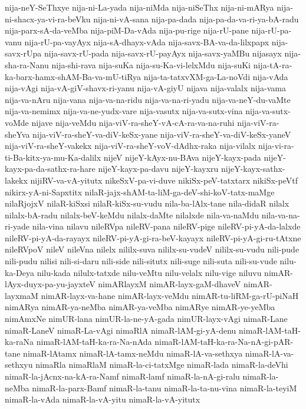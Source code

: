 {nija-neY-SeThxye
nija-ni-La-yada
nija-niMda
nija-niSeThx
nija-ni-mARya
nija-ni-shacx-ya-vi-ra-beVku
nija-ni-vA-sana
nija-pa-dada
nija-pa-da-va-ri-ya-bA-radu
nija-parx-sA-da-veMba
nija-piM-Da-vAda
nija-pu-rige
nija-rU-pane
nija-rU-pa-vanu
nija-rU-pa-vayAyx
nija-sA-dhayx-vAda
nija-savx-BA-va-da-lilxpapx
nija-savx-rUpa
nija-savx-rU-pada
nija-savx-rU-payAyx
nija-savx-yaMBu
nijasayx
nija-sha-ra-Nanu
nija-shi-rava
nija-suKa
nija-su-Ka-vi-lelxMdu
nija-suKi
nija-tA-ra-ka-barx-hamx-shAM-Ba-va-mU-tiRya
nija-ta-tatxvXM-ga-La-noVdi
nija-vAda
nija-vAgi
nija-vA-giV-shavx-ri-yanu
nija-vA-giyU
nijava
nija-valalx
nija-vama
nija-va-nAru
nija-vana
nija-va-na-ridu
nija-va-na-ri-yadu
nija-va-neY-du-vaMte
nija-va-nemimx
nija-va-ne-yudx-vare
nija-vasutx
nija-va-sutx-vina
nija-va-sutx-voMde
nijave
nija-veMdu
nija-viV-ra-sheY-vA-cA-ra-va-na-ruhi
nija-viV-ra-sheYva
nija-viV-ra-sheY-va-diV-keSx-yane
nija-viV-ra-sheY-va-diV-keSx-yaneV
nija-viV-ra-sheY-vakekx
nija-viV-ra-sheY-voV-dAdhx-raka
nija-vilalx
nija-vi-ra-ti-Ba-kitx-ya-mu-Ka-dalilx
nijeV
nijeY-kAyx-nu-BAva
nijeY-kayx-pada
nijeY-kayx-pa-da-sathx-ra-hare
nijeY-kayx-pa-davu
nijeY-kayxru
nijeY-kayx-sathx-lakekx
nijiRV-va-vA-yitutx
nikeSxV-pa-vi-duve
nikiSx-peV-tatxtarx
nikiSx-peVtf
nikirx-yA-ni-Sapxtitx
nilaR-jajx-shAM-ta-liM-ga-deV-shi-koV-tatx-maMge
nilaRjojxV
nilaR-kiSxsi
nilaR-kiSx-su-vudu
nila-ba-lAlx-tane
nila-didaR
nilalx
nilalx-bA-radu
nilalx-beV-keMdu
nilalx-daMte
nilalxde
nila-va-naMdu
nila-va-na-ri-yade
nila-vina
nilavu
nileRVpa
nileRV-pana
nileRV-pige
nileRV-pi-yA-da-lalxde
nileRV-pi-yA-da-rayayx
nileRV-pi-yA-gi-ra-beV-kayayx
nileRV-pi-yA-gi-ru-tAtxne
nileRVpoV
nileV
nileVna
nilelx
nililx-suva
nililx-su-vudeV
nililx-su-vudu
nili-pude
nili-pudu
nilisi
nili-si-daru
nili-side
nili-situtx
nili-suge
nili-suta
nili-su-vude
nilu-ka-Deya
nilu-kada
nilulx-tatxde
nilu-veMtu
nilu-velalx
nilu-vige
niluvu
nimAR-lAyx-duyx-pa-yu-jayxteV
nimARlayxM
nimAR-layx-gaM-dhaveV
nimAR-layxmaM
nimAR-layx-va-hane
nimAR-layx-veMdu
nimAR-tu-liRM-ga-rU-piNaH
nimARya
nimAR-ya-neMba
nimAR-ya-veMba
nimARye
nimAR-ye-yeMba
nimAmxNe
nimUR-lana
nimUR-la-ne-yA-gada
nimUR-layx-vAgi
nimaR-Lane
nimaR-LaneV
nimaR-La-vAgi
nimaRlA
nimaR-lAM-gi-yA-denu
nimaR-lAM-taH-ka-raNa
nimaR-lAM-taH-ka-ra-Na-nAda
nimaR-lAM-taH-ka-ra-Na-nA-gi-pAR-tane
nimaR-lAtamx
nimaR-lA-tamx-neMdu
nimaR-lA-va-sethxya
nimaR-lA-va-sethxyu
nimaRla
nimaRlaM
nimaR-la-ci-tatxMge
nimaR-lada
nimaR-la-deVhi
nimaR-la-jAcnx-na-kA-ra-Namf
nimaR-lamf
nimaR-la-nA-gi-ralu
nimaR-la-neMba
nimaR-la-parx-Bamf
nimaR-la-tanu
nimaR-la-ta-nu-vina
nimaR-la-teyiM
nimaR-la-vAda
nimaR-la-vA-yitu
nimaR-la-vA-yitutx
}
